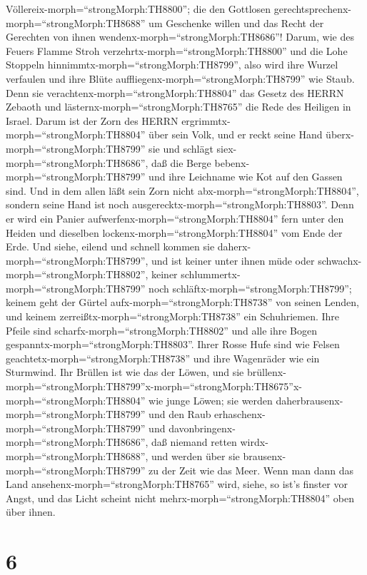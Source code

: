 Völlereix-morph=``strongMorph:TH8800'';  die den Gottlosen
gerechtsprechenx-morph=``strongMorph:TH8688'' um Geschenke willen und
das Recht der Gerechten von ihnen wendenx-morph=``strongMorph:TH8686''!
 Darum, wie des Feuers Flamme Stroh
verzehrtx-morph=``strongMorph:TH8800'' und die Lohe Stoppeln
hinnimmtx-morph=``strongMorph:TH8799'', also wird ihre Wurzel verfaulen
und ihre Blüte auffliegenx-morph=``strongMorph:TH8799'' wie Staub. Denn
sie verachtenx-morph=``strongMorph:TH8804'' das Gesetz des HERRN Zebaoth
und lästernx-morph=``strongMorph:TH8765'' die Rede des Heiligen in
Israel.  Darum ist der Zorn des HERRN
ergrimmtx-morph=``strongMorph:TH8804'' über sein Volk, und er reckt
seine Hand überx-morph=``strongMorph:TH8799'' sie und schlägt
siex-morph=``strongMorph:TH8686'', daß die Berge
bebenx-morph=``strongMorph:TH8799'' und ihre Leichname wie Kot auf den
Gassen sind. Und in dem allen läßt sein Zorn nicht
abx-morph=``strongMorph:TH8804'', sondern seine Hand ist noch
ausgerecktx-morph=``strongMorph:TH8803''.  Denn er wird ein
Panier aufwerfenx-morph=``strongMorph:TH8804'' fern unter den Heiden und
dieselben lockenx-morph=``strongMorph:TH8804'' vom Ende der Erde. Und
siehe, eilend und schnell kommen sie
daherx-morph=``strongMorph:TH8799'',  und ist keiner unter
ihnen müde oder schwachx-morph=``strongMorph:TH8802'', keiner
schlummertx-morph=``strongMorph:TH8799'' noch
schläftx-morph=``strongMorph:TH8799''; keinem geht der Gürtel
aufx-morph=``strongMorph:TH8738'' von seinen Lenden, und keinem
zerreißtx-morph=``strongMorph:TH8738'' ein Schuhriemen. 
Ihre Pfeile sind scharfx-morph=``strongMorph:TH8802'' und alle ihre
Bogen gespanntx-morph=``strongMorph:TH8803''. Ihrer Rosse Hufe sind wie
Felsen geachtetx-morph=``strongMorph:TH8738'' und ihre Wagenräder wie
ein Sturmwind.  Ihr Brüllen ist wie das der Löwen, und sie
brüllenx-morph=``strongMorph:TH8799''\textbar x-morph=``strongMorph:TH8675''x-morph=``strongMorph:TH8804''
wie junge Löwen; sie werden daherbrausenx-morph=``strongMorph:TH8799''
und den Raub erhaschenx-morph=``strongMorph:TH8799'' und
davonbringenx-morph=``strongMorph:TH8686'', daß niemand retten
wirdx-morph=``strongMorph:TH8688'',  und werden über sie
brausenx-morph=``strongMorph:TH8799'' zu der Zeit wie das Meer. Wenn man
dann das Land ansehenx-morph=``strongMorph:TH8765'' wird, siehe, so
ist's finster vor Angst, und das Licht scheint nicht
mehrx-morph=``strongMorph:TH8804'' oben über ihnen.

\hypertarget{section-5}{%
\section{6}\label{section-5}}

